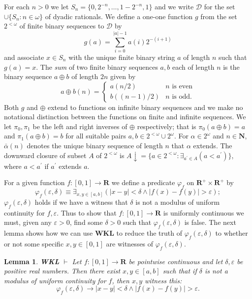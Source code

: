 \documentclass[11pt]{amsart}
\newtheorem{lemma}{Lemma}
\begin{document}
\bigskip
\noindent
For each $n>0$ we let $S_n=\{0,2^{-n},\ldots,1-2^{-n},1\}$ and we write $\mathcal{D}$ for the set $\cup\{S_n:n\in\omega\}$ of dyadic rationals. We define a one-one function $g$ from the set $2^{<\omega}$ of finite binary sequences to $\mathcal{D}$ by
 $$
  g(a)=\sum_{i=0}^{|a|-1} a(i)2^{-(i+1)}
 $$
\noindent
and associate $x\in S_n$ with the unique finite binary string $a$ of length $n$ such that $g(a)=x$. The \emph{sum} of two finite binary sequences $a,b$ each of length $n$ is the binary sequence $a\oplus b$ of length $2n$ given by
 $$
 a\oplus b(n)=\left\{\begin{array}{ll}a(n/2) & n\mbox{ is even}\\ b((n-1)/2) & n\mbox{ is odd}.\end{array}\right. 
 $$
Both $g$ and $\oplus$ extend to functions on infinite binary sequences and we make no notational distinction between the functions on finite and infinite sequences. We let $\pi_0,\pi_1$ be the left and right inverses of $\oplus$ respectively; that is $\pi_0(a\oplus b)=a$ and $\pi_1(a\oplus b)=b$ for all suitable pairs $a,b\in2^{<\omega}\cup2^\omega$. For $\alpha\in2^\omega$ and $n\in\mathbf{N}$, $\bar{\alpha}(n)$ denotes the unique binary sequence of length $n$ that $\alpha$ extends. The downward closure of subset $A$ of $2^{<\omega}$ is $A\downarrow = \{a\in2^{<\omega}: \exists_{a^\prime\in A}(a < a^\prime)\}$, where $a < a^\prime$ if $a^\prime$ extends $a$. 

\bigskip
\noindent
For a given function $f:[0, 1]\rightarrow\mathbf{R}$ we define a predicate $\varphi_f$ on $\mathbf{R}^+\times\mathbf{R}^+$ by
 $$
  \varphi_f(\varepsilon,\delta)\equiv \exists_{x,y\in[a,b]}(|x-y|<\delta\wedge|f(x)-f(y)|>\varepsilon);
 $$
$\varphi_f(\varepsilon,\delta)$ holds if we have a witness that $\delta$ is not a modulus of uniform continuity for $f,\varepsilon$. Thus to show that $f:[0, 1]\rightarrow\mathbf{R}$ is uniformly continuous we must, given any $\varepsilon>0$, find some $\delta>0$ such that $\varphi_f(\varepsilon,\delta)$ is false. The next lemma shows how we can use \textbf{WKL} to reduce the truth of $\varphi_f(\varepsilon,\delta)$ to whether or not some specific $x,y\in[0, 1]$ are witnesses of  $\varphi_f(\varepsilon,\delta)$.


\begin{lemma}\label{L1}
 \textbf{WKL} $\vdash$ Let $f:[0, 1]\rightarrow\mathbf{R}$ be pointwise continuous and let $\delta,\varepsilon$ be positive real numbers. Then there exist $x,y\in[a,b]$ such that if $\delta$ is not a modulus of uniform continuity for $f$, then $x,y$ witness this:
  $$
   \varphi_f(\varepsilon,\delta) \rightarrow |x-y|<\delta \wedge |f(x)-f(y)|>\varepsilon.
  $$
\end{lemma}
\end{document}
